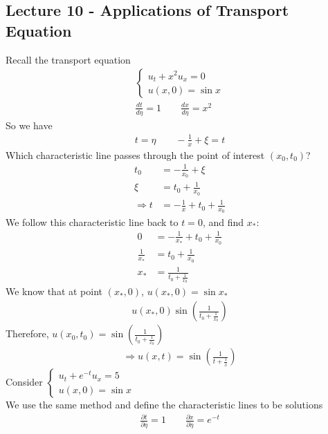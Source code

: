 \documentclass[12pt, letterpaper]{article}
\begin{document}
\subsection{Lecture 10 - Applications of Transport Equation}
Recall the transport equation 
\begin{align*}
    \begin{cases}
        u_t + x^2u_x = 0 \\
        u(x,0) = \sin x
    \end{cases} \\
    \frac{dt}{d\eta} = 1 \qquad \frac{dx}{d\eta} = x^2 
\end{align*}
So we have 
\begin{align*}
    t = \eta \qquad -\frac 1x + \xi = t
\end{align*}
Which characteristic line passes through the point of interest $(x_0, t_0)$?
\begin{align*}
    t_0 &= -\frac{1}{x_0} + \xi \\
    \xi &= t_0 + \frac{1}{x_0} \\
    \Rightarrow t &= -\frac 1x + t_0 + \frac 1{x_0} 
\end{align*}
We follow this characteristic line back to $t = 0$, and find $x_\ast$:
\begin{align*}
    0 &= -\frac{1}{x_\ast} + t_0 + \frac{1}{x_0} \\
    \frac{1}{x_\ast} &= t_0 + \frac{1}{x_0} \\
    x_\ast &= \frac{1}{t_0 + \frac{1}{x_0}}
\end{align*}
We know that at point $(x_\ast,0)$, $u(x_\ast, 0) = \sin x_\ast$
\begin{align*}
    u(x_\ast, 0) \sin(\frac{1}{t_0 + \frac{1}{x_0}})
\end{align*}
Therefore, $u(x_0, t_0) = \sin(\frac{1}{t_0 + \frac{1}{x_0}})$
\begin{align*}
    \Rightarrow u(x,t) = \sin(\frac{1}{t+\frac 1x})
\end{align*} 
 Consider $\begin{cases}
    u_t + e^{-t}u_x = 5 \\
    u(x,0) = \sin x
\end{cases}$ \\
We use the same method and define the characteristic lines to be solutions
\begin{align*}
    \frac{\partial t }{\partial \eta} = 1\qquad \frac{\partial x}{\partial \eta} = e^{-t}
\end{align*}
\end{document}

